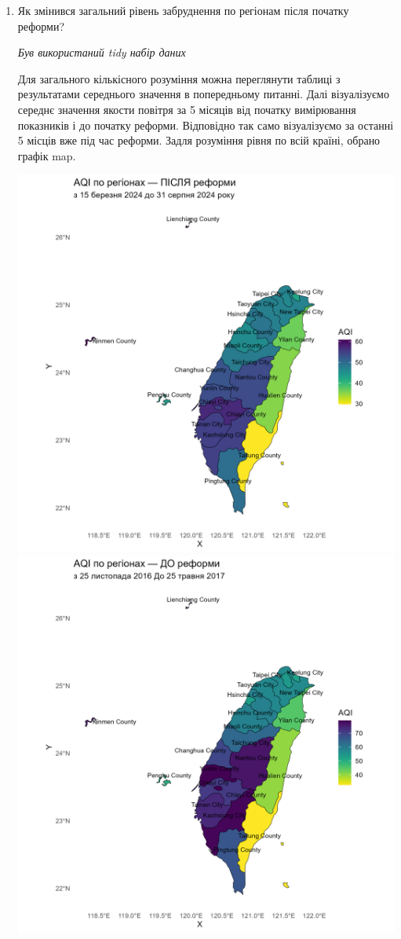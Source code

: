 \documentclass{article}
\begin{document}
\begin{enumerate}
    \item Як змінився загальний рівень забруднення по регіонам після початку реформи?
    
    \quad \textit{Був використаний tidy набір даних}

    Для загального кількісного розуміння можна переглянути таблиці з результатами середнього значення в попередньому питанні. 
    Далі візуалізуємо середнє значення якости повітря за 5 місяців від початку вимірювання показників і до початку реформи. Відповідно так само візуалізуємо за останні 5 місців вже під час реформи. 
    Задля розуміння рівня по всій країні, обрано графік map. 
    
    \begin{center}
    \includegraphics[width=6in]{plots/question5/map_after_reform.png}
    \includegraphics[width=6in]{plots/question5/map_before_reform.png}

\end{center}
\end{enumerate}
\end{document}
